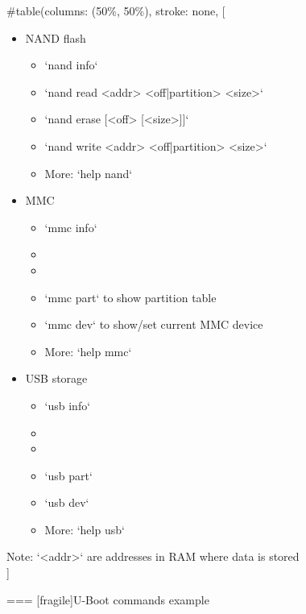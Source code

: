 #table(columns: (50\%, 50\%), stroke: none,
[
    \begin{itemize}
    \item NAND flash
      \begin{itemize}
      \item `nand info`
      \item `nand read <addr> <off|partition> <size>`
      \item `nand erase [<off> [<size>]]`
      \item `nand write <addr> <off|partition> <size>`
      \item More: `help nand`
      \end{itemize}
    \item MMC
      \begin{itemize}
      \item `mmc info`
      \item {}
      \item {}
      \item `mmc part` to show partition table
      \item `mmc dev` to show/set current MMC device
      \item More: `help mmc`
      \end{itemize}
    \end{itemize}
    \vfill
    \begin{itemize}
    \item USB storage
      \begin{itemize}
      \item `usb info`
      \item {}
      \item {}
      \item `usb part`
      \item `usb dev`
      \item More: `help usb`
      \end{itemize}
    \end{itemize}
    Note: `<addr>` are addresses in RAM where data is stored
  \\]
  \vspace{0.2cm}


=== [fragile]{U-Boot commands example}
  
